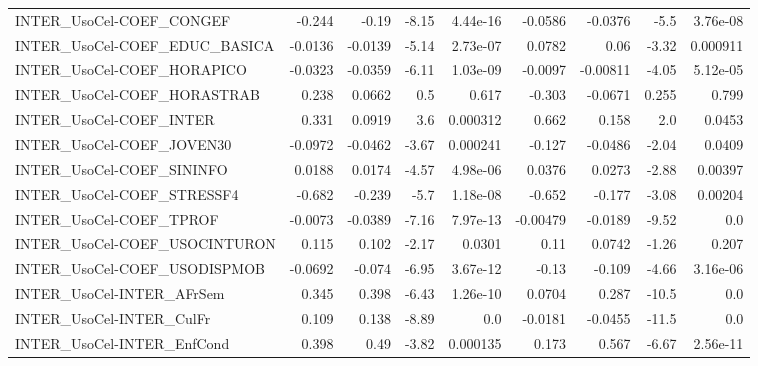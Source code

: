 \begin{tabular}{lrrrrrrrr}
INTER\_UsoCel-COEF\_CONGEF              &      -0.244 &        -0.19 &   -8.15 & 4.44e-16 &    -0.0586 &     -0.0376 &         -5.5 &      3.76e-08 \\
INTER\_UsoCel-COEF\_EDUC\_BASICA         &     -0.0136 &      -0.0139 &   -5.14 & 2.73e-07 &     0.0782 &        0.06 &        -3.32 &      0.000911 \\
INTER\_UsoCel-COEF\_HORAPICO            &     -0.0323 &      -0.0359 &   -6.11 & 1.03e-09 &    -0.0097 &    -0.00811 &        -4.05 &      5.12e-05 \\
INTER\_UsoCel-COEF\_HORASTRAB           &       0.238 &       0.0662 &     0.5 &    0.617 &     -0.303 &     -0.0671 &        0.255 &         0.799 \\
INTER\_UsoCel-COEF\_INTER               &       0.331 &       0.0919 &     3.6 & 0.000312 &      0.662 &       0.158 &          2.0 &        0.0453 \\
INTER\_UsoCel-COEF\_JOVEN30             &     -0.0972 &      -0.0462 &   -3.67 & 0.000241 &     -0.127 &     -0.0486 &        -2.04 &        0.0409 \\
INTER\_UsoCel-COEF\_SININFO             &      0.0188 &       0.0174 &   -4.57 & 4.98e-06 &     0.0376 &      0.0273 &        -2.88 &       0.00397 \\
INTER\_UsoCel-COEF\_STRESSF4            &      -0.682 &       -0.239 &    -5.7 & 1.18e-08 &     -0.652 &      -0.177 &        -3.08 &       0.00204 \\
INTER\_UsoCel-COEF\_TPROF               &     -0.0073 &      -0.0389 &   -7.16 & 7.97e-13 &   -0.00479 &     -0.0189 &        -9.52 &           0.0 \\
INTER\_UsoCel-COEF\_USOCINTURON         &       0.115 &        0.102 &   -2.17 &   0.0301 &       0.11 &      0.0742 &        -1.26 &         0.207 \\
INTER\_UsoCel-COEF\_USODISPMOB          &     -0.0692 &       -0.074 &   -6.95 & 3.67e-12 &      -0.13 &      -0.109 &        -4.66 &      3.16e-06 \\
INTER\_UsoCel-INTER\_AFrSem             &       0.345 &        0.398 &   -6.43 & 1.26e-10 &     0.0704 &       0.287 &        -10.5 &           0.0 \\
INTER\_UsoCel-INTER\_CulFr              &       0.109 &        0.138 &   -8.89 &      0.0 &    -0.0181 &     -0.0455 &        -11.5 &           0.0 \\
INTER\_UsoCel-INTER\_EnfCond            &       0.398 &         0.49 &   -3.82 & 0.000135 &      0.173 &       0.567 &        -6.67 &      2.56e-11 \\

\end{tabular}
